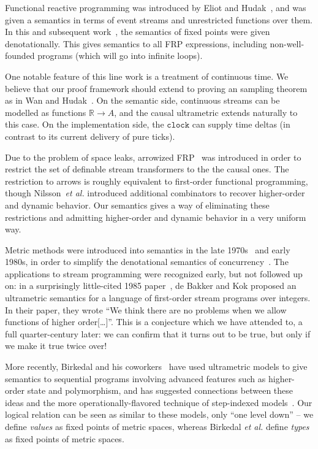 \documentclass[preprint]{sigplanconf}
\newcommand{\term}[1]{\ensuremath{\mathtt{{#1}}}}
\begin{document}
Functional reactive programming was introduced by Eliot and
Hudak~\cite{fran}, and was given a semantics in terms of event streams
and unrestricted functions over them. In this and subsequent
work~\cite{courtney-thesis}, the semantics of fixed points were given
denotationally. This gives semantics to all FRP expressions, including
non-well-founded programs (which will go into infinite loops). 

One notable feature of this line work is a treatment of continuous
time. We believe that our proof framework should extend to proving an
sampling theorem as in Wan and Hudak~\cite{frp-first-principles}.  On
the semantic side, continuous streams can be modelled as functions
$\mathbb{R} \to A$, and the causal ultrametric extends naturally to
this case. On the implementation side, the \term{clock} can supply
time deltas (in contrast to its current delivery of pure ticks).

Due to the problem of space leaks, arrowized FRP~\cite{arrowized-frp}
was introduced in order to restrict the set of definable stream
transformers to the the causal ones. The restriction to arrows is
roughly equivalent to first-order functional programming, though
Nilsson~\emph{et al.}  introduced additional combinators to recover
higher-order and dynamic behavior. Our semantics gives a way of
eliminating these restrictions and admitting higher-order and dynamic
behavior in a very uniform way.

Metric methods were introduced into semantics in the late
1970s~\cite{nivat} and early 1980s, in order to simplify the
denotational semantics of
concurrency~\cite{concurrency-semantics}. The applications to stream
programming were recognized early, but not followed up on: in a
surprisingly little-cited 1985 paper~\cite{metric-dataflow}, de Bakker
and Kok proposed an ultrametric semantics for a language of
first-order stream programs over integers. In their paper, they wrote
``We think there are no problems when we allow functions of higher
order[\ldots]''.  This is a conjecture which we have attended to, a
full quarter-century later: we can confirm that it turns out to be
true, but only if we make it true twice over!

More recently, Birkedal and his coworkers~\cite{birkedal-ultrametrics}
have used ultrametric models to give semantics to sequential programs
involving advanced features such as higher-order state and
polymorphism, and has suggested connections between these ideas and
the more operationally-flavored technique of step-indexed
models~\cite{appel-mcallester}. Our logical relation can be seen as
similar to these models, only ``one level down'' -- we define
\emph{values} as fixed points of metric spaces, whereas Birkedal
\emph{et al.} define \emph{types} as fixed points of metric spaces.
\end{document}

